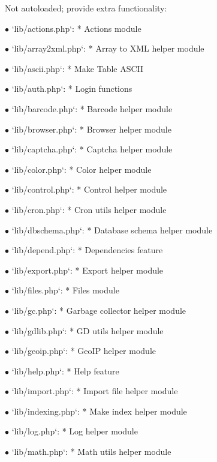 \documentclass[a4paper]{article}
\begin{document}
Not autoloaded; provide extra functionality:

\begin{compactitem}
\item[\color{myblue}$\bullet$] `lib/actions.php`: * Actions module
\item[\color{myblue}$\bullet$] `lib/array2xml.php`: * Array to XML helper module
\item[\color{myblue}$\bullet$] `lib/ascii.php`: * Make Table ASCII
\item[\color{myblue}$\bullet$] `lib/auth.php`: * Login functions
\item[\color{myblue}$\bullet$] `lib/barcode.php`: * Barcode helper module
\item[\color{myblue}$\bullet$] `lib/browser.php`: * Browser helper module
\item[\color{myblue}$\bullet$] `lib/captcha.php`: * Captcha helper module
\item[\color{myblue}$\bullet$] `lib/color.php`: * Color helper module
\item[\color{myblue}$\bullet$] `lib/control.php`: * Control helper module
\item[\color{myblue}$\bullet$] `lib/cron.php`: * Cron utils helper module
\item[\color{myblue}$\bullet$] `lib/dbschema.php`: * Database schema helper module
\item[\color{myblue}$\bullet$] `lib/depend.php`: * Dependencies feature
\item[\color{myblue}$\bullet$] `lib/export.php`: * Export helper module
\item[\color{myblue}$\bullet$] `lib/files.php`: * Files module
\item[\color{myblue}$\bullet$] `lib/gc.php`: * Garbage collector helper module
\item[\color{myblue}$\bullet$] `lib/gdlib.php`: * GD utils helper module
\item[\color{myblue}$\bullet$] `lib/geoip.php`: * GeoIP helper module
\item[\color{myblue}$\bullet$] `lib/help.php`: * Help feature
\item[\color{myblue}$\bullet$] `lib/import.php`: * Import file helper module
\item[\color{myblue}$\bullet$] `lib/indexing.php`: * Make index helper module
\item[\color{myblue}$\bullet$] `lib/log.php`: * Log helper module
\item[\color{myblue}$\bullet$] `lib/math.php`: * Math utils helper module

\end{compactitem}
\end{document}
